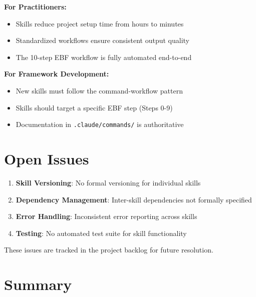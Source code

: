 \textbf{For Practitioners:}
\begin{itemize}
    \item Skills reduce project setup time from hours to minutes
    \item Standardized workflows ensure consistent output quality
    \item The 10-step EBF workflow is fully automated end-to-end
\end{itemize}

\textbf{For Framework Development:}
\begin{itemize}
    \item New skills must follow the command-workflow pattern
    \item Skills should target a specific EBF step (Steps 0-9)
    \item Documentation in \texttt{.claude/commands/} is authoritative
\end{itemize}


\section{Open Issues}
\label{sec:skills-open-issues}

\begin{enumerate}
    \item \textbf{Skill Versioning}: No formal versioning for individual skills
    \item \textbf{Dependency Management}: Inter-skill dependencies not formally specified
    \item \textbf{Error Handling}: Inconsistent error reporting across skills
    \item \textbf{Testing}: No automated test suite for skill functionality
\end{enumerate}

These issues are tracked in the project backlog for future resolution.


\section{Summary}
\label{sec:skills-summary}

